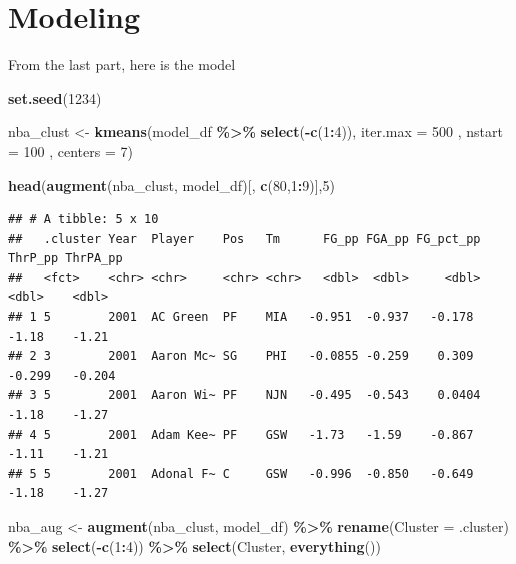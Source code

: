 \documentclass[
]{article}
\newenvironment{Shaded}{\begin{snugshade}}{\end{snugshade}}
\newcommand{\AttributeTok}[1]{\textcolor[rgb]{0.13,0.29,0.53}{#1}}
\newcommand{\DecValTok}[1]{\textcolor[rgb]{0.00,0.00,0.81}{#1}}
\newcommand{\FunctionTok}[1]{\textcolor[rgb]{0.13,0.29,0.53}{\textbf{#1}}}
\newcommand{\NormalTok}[1]{#1}
\newcommand{\OtherTok}[1]{\textcolor[rgb]{0.56,0.35,0.01}{#1}}
\newcommand{\SpecialCharTok}[1]{\textcolor[rgb]{0.81,0.36,0.00}{\textbf{#1}}}
\begin{document}
\hypertarget{modeling}{%
\section{Modeling}\label{modeling}}

From the last part, here is the model

\begin{Shaded}
\begin{Highlighting}[]
\FunctionTok{set.seed}\NormalTok{(}\DecValTok{1234}\NormalTok{)}

\NormalTok{nba\_clust }\OtherTok{\textless{}{-}} \FunctionTok{kmeans}\NormalTok{(model\_df }\SpecialCharTok{\%\textgreater{}\%} \FunctionTok{select}\NormalTok{(}\SpecialCharTok{{-}}\FunctionTok{c}\NormalTok{(}\DecValTok{1}\SpecialCharTok{:}\DecValTok{4}\NormalTok{)),}
                    \AttributeTok{iter.max =} \DecValTok{500}\NormalTok{ , }
                    \AttributeTok{nstart =} \DecValTok{100}\NormalTok{ ,}
                    \AttributeTok{centers =} \DecValTok{7}\NormalTok{)}
\end{Highlighting}
\end{Shaded}

\begin{Shaded}
\begin{Highlighting}[]
\FunctionTok{head}\NormalTok{(}\FunctionTok{augment}\NormalTok{(nba\_clust, model\_df)[, }\FunctionTok{c}\NormalTok{(}\DecValTok{80}\NormalTok{,}\DecValTok{1}\SpecialCharTok{:}\DecValTok{9}\NormalTok{)],}\DecValTok{5}\NormalTok{) }
\end{Highlighting}
\end{Shaded}

\begin{verbatim}
## # A tibble: 5 x 10
##   .cluster Year  Player    Pos   Tm      FG_pp FGA_pp FG_pct_pp ThrP_pp ThrPA_pp
##   <fct>    <chr> <chr>     <chr> <chr>   <dbl>  <dbl>     <dbl>   <dbl>    <dbl>
## 1 5        2001  AC Green  PF    MIA   -0.951  -0.937   -0.178   -1.18    -1.21 
## 2 3        2001  Aaron Mc~ SG    PHI   -0.0855 -0.259    0.309   -0.299   -0.204
## 3 5        2001  Aaron Wi~ PF    NJN   -0.495  -0.543    0.0404  -1.18    -1.27 
## 4 5        2001  Adam Kee~ PF    GSW   -1.73   -1.59    -0.867   -1.11    -1.21 
## 5 5        2001  Adonal F~ C     GSW   -0.996  -0.850   -0.649   -1.18    -1.27
\end{verbatim}

\begin{Shaded}
\begin{Highlighting}[]
\NormalTok{nba\_aug }\OtherTok{\textless{}{-}} \FunctionTok{augment}\NormalTok{(nba\_clust, model\_df) }\SpecialCharTok{\%\textgreater{}\%} 
  \FunctionTok{rename}\NormalTok{(}\AttributeTok{Cluster =}\NormalTok{ .cluster) }\SpecialCharTok{\%\textgreater{}\%}
  \FunctionTok{select}\NormalTok{(}\SpecialCharTok{{-}}\FunctionTok{c}\NormalTok{(}\DecValTok{1}\SpecialCharTok{:}\DecValTok{4}\NormalTok{)) }\SpecialCharTok{\%\textgreater{}\%}
  \FunctionTok{select}\NormalTok{(Cluster, }\FunctionTok{everything}\NormalTok{()) }
\end{Highlighting}
\end{Shaded}
\end{document}
